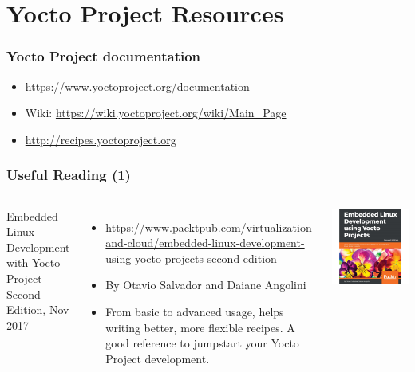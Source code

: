 \section{Yocto Project Resources}

\begin{frame}
  \frametitle{Yocto Project documentation}
  \begin{itemize}
  \item \url{https://www.yoctoproject.org/documentation}
  \item Wiki: \url{https://wiki.yoctoproject.org/wiki/Main_Page}
  \item \url{http://recipes.yoctoproject.org}
  \end{itemize}
\end{frame}

\begin{frame}
  \frametitle{Useful Reading (1)}
  \begin{columns}
    Embedded Linux Development with Yocto Project - Second Edition, Nov 2017
    \begin{itemize}
    \item \url{https://www.packtpub.com/virtualization-and-cloud/embedded-linux-development-using-yocto-projects-second-edition}
    \item By Otavio Salvador and Daiane Angolini
    \item From basic to advanced usage, helps writing better, more
      flexible recipes. A good reference to jumpstart your Yocto
      Project development.
    \end{itemize}
    \includegraphics[width=\textwidth]{slides/yocto-resources/ELDYP.jpg}
  \end{columns}
\end{frame}


